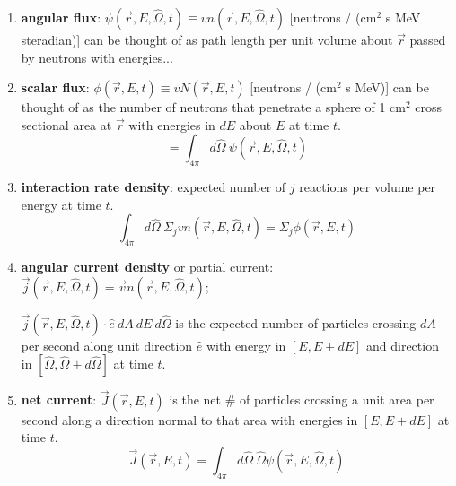 \documentclass[12pt]{article}
\newcommand{\vOmega}{\ensuremath{\hat{\Omega}}}
\begin{document}
\begin{enumerate}
\item \textbf{angular flux}: $\psi(\vec{r}, E, \vOmega, t) \equiv v n(\vec{r}, E, \vOmega, t)$ [neutrons / (cm$^2$ s MeV steradian)] can be thought of as path length per unit volume about $\vec{r}$ passed by neutrons with energies...

\item \textbf{scalar flux}: $\phi(\vec{r},E,t) \equiv v N(\vec{r},E,t)$ [neutrons / (cm$^2$ s MeV)] can be thought of as the number of neutrons that penetrate a sphere of 1 cm$^2$ cross sectional area at $\vec{r}$ with energies in $dE$ about $E$ at time $t$.
%
\[= \int_{4\pi} d\vOmega\: \psi(\vec{r}, E, \vOmega, t) \]

\item \textbf{interaction rate density}: expected number of $j$ reactions per volume per energy at time $t$.
%
\[\int_{4\pi} d\vOmega \:\Sigma_j v n(\vec{r}, E, \vOmega, t) = \Sigma_j \phi(\vec{r},E,t)\]

\item \textbf{angular current density} or partial current: $\vec{j}(\vec{r}, E, \vOmega, t) = \vec{v} n(\vec{r}, E, \vOmega, t)$; 

$\vec{j}(\vec{r}, E, \vOmega, t) \cdot \hat{e}\: dA\: dE\: d\vOmega$ is the expected number of particles crossing $dA$ per second along unit direction $\hat{e}$ with energy in $[E, E + dE]$ and direction in $[\vOmega, \vOmega + d\vOmega]$ at time $t$.

\item \textbf{net current}: $\vec{J}(\vec{r}, E, t) $ is the net \# of particles crossing a unit area per second along a direction normal to that area with energies in $[E, E + dE]$ at time $t$.
\[\vec{J}(\vec{r}, E, t) = \int_{4\pi} d\vOmega\: \vOmega \psi(\vec{r}, E, \vOmega, t)\]

\end{enumerate}

\end{document}
